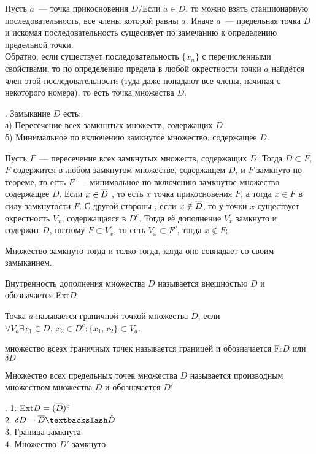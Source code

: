 \D  Пусть $a$~--- точка прикосновения $D$/Если $a \in D$, то можно взять станционарную последовательность, все члены которой равны $a$. Иначе $a$~--- предельная точка $D$ и искомая последовательность сущесивует по замечанию к определению предельной точки.\\
Обратно, если существует последовательность $\{x_n\}$ с перечисленными свойствами, то по определению предела в любой окрестности точки $a$ найдётся член этой последовательности (туда даже попадают все члены, начиная с некоторого номера), то есть точка множества $D$.

. Замыкание $D$ есть:\\
а) Пересечение всех замкнцтых множеств, содержащих $D$\\
б) Минимальное по включению замкнутое множество, содержащее $D$.

\D Пусть $F$~--- пересечение всех замкнутых множеств, содержащих $D$. Тогда $D \subset F$, $F$ содержится в любом замкнутом множестве, содержащем $D$, и $F$ замкнуто по теореме, то есть $F$~--- минимальное по включению замкнутое множество содержащее $D$. Если $x \in \overline{D}$ , то есть $x$ точка прикосновения $F$, а тогда $x \in F$ в силу замкнутости $F$. С другой стороны , если $x \notin \overline{D}$, то у точки $x$ существует окрестность $V_x$, содержащаяся в $D^c$. Тогда её дополнение $V^c_x$ замкнуто и содержит $D$, поэтому $F \subset V^c_x$, то есть $V_x \subset F^c$, тогда $x\notin F$;

 Множество замкнуто тогда и толко тогда, когда оно совпадает со своим замыканием.

\Op Внутренность дополнения множества $D$ называется внешностью $D$ и обозначается Ext$D$

\Op Точка $a$ называется граничной точкой множества $D$, если\\
$\forall V_a \exists x_1\in D,\ x_2\in D^c: \{x_1, x_2\} \subset V_a$.

\Op множество всезх граничных точек называется границей и обозначается Fr$D$ или $\delta D$

\Op Множество всех предельных точек множества $D$ называется производным множеством множества $D$ и обозначается $D'$

. 1. Ext$D = (\overline{D})^c$\\
2. $\delta D = \ol{D}\bsl \mathring{D}$\\
3. Граница замкнута\\
4. Множество $D'$ замкнуто
